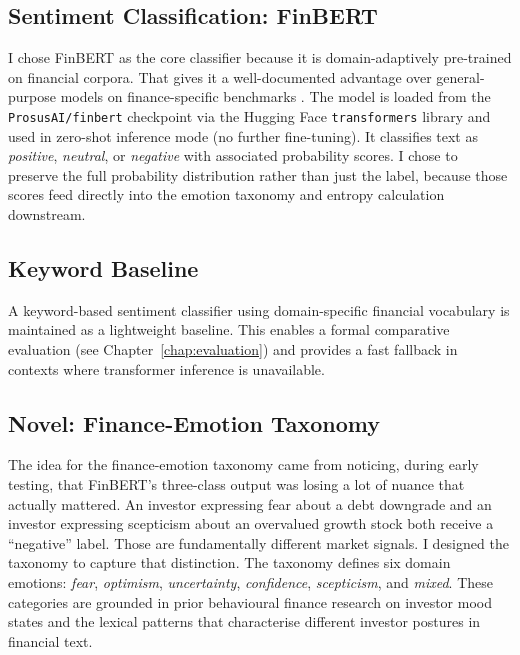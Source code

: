 \subsection{Sentiment Classification: FinBERT}

I chose FinBERT \citep{araci2019finbert} as the core classifier because it is domain-adaptively pre-trained on financial corpora. That gives it a well-documented advantage over general-purpose models on finance-specific benchmarks \citep{malo2014financialphrasebank}. The model is loaded from the \texttt{ProsusAI/finbert} checkpoint via the Hugging Face \texttt{transformers} library \citep{wolf2020transformers} and used in zero-shot inference mode (no further fine-tuning). It classifies text as \textit{positive}, \textit{neutral}, or \textit{negative} with associated probability scores. I chose to preserve the full probability distribution rather than just the label, because those scores feed directly into the emotion taxonomy and entropy calculation downstream.

\subsection{Keyword Baseline}

A keyword-based sentiment classifier using domain-specific financial vocabulary is maintained as a lightweight baseline.  This enables a formal comparative evaluation (see Chapter~\ref{chap:evaluation}) and provides a fast fallback in contexts where transformer inference is unavailable.

\subsection{Novel: Finance-Emotion Taxonomy}
\label{sec:emotion_design}

The idea for the finance-emotion taxonomy came from noticing, during early testing, that FinBERT's three-class output was losing a lot of nuance that actually mattered. An investor expressing fear about a debt downgrade and an investor expressing scepticism about an overvalued growth stock both receive a ``negative'' label. Those are fundamentally different market signals. I designed the taxonomy to capture that distinction.  The taxonomy defines six domain emotions: \textit{fear}, \textit{optimism}, \textit{uncertainty}, \textit{confidence}, \textit{scepticism}, and \textit{mixed}.  These categories are grounded in prior behavioural finance research on investor mood states \citep{bollen2011twitter} and the lexical patterns that characterise different investor postures in financial text.

